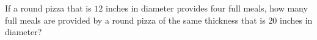 If a round pizza that is $12$ inches in diameter provides four full meals, how many full meals are provided by a round pizza of the same thickness that is $20$ inches in diameter?
